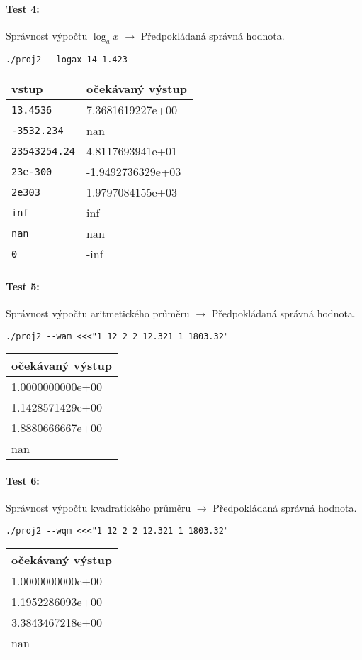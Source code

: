 \documentclass[12pt,a4paper,titlepage,final]{article}
\begin{document}
\paragraph{Test 4:} Správnost výpočtu $\log_{a}{x}$ $\longrightarrow$ Předpokládaná správná hodnota.
\begin{verbatim}
./proj2 --logax 14 1.423
\end{verbatim}
\vspace{1em}\begin{tabular}{ll} %
vstup & očekávaný výstup \\
\hline
\verb|13.4536| & 7.3681619227e+00 \\
\verb|-3532.234| & nan \\
\verb|23543254.24| & 4.8117693941e+01 \\
\verb|23e-300| & -1.9492736329e+03\\
\verb|2e303| & 1.9797084155e+03 \\
\verb|inf| & inf \\
\verb|nan| & nan \\
\verb|0| & -inf \\
\end{tabular}

\paragraph{Test 5:} Správnost výpočtu aritmetického průměru $\longrightarrow$ Předpokládaná správná hodnota.
\begin{verbatim}
./proj2 --wam <<<"1 12 2 2 12.321 1 1803.32"
\end{verbatim} 
\vspace{1em}\begin{tabular}{l} %
očekávaný výstup \\
\hline
1.0000000000e+00 \\
1.1428571429e+00 \\
1.8880666667e+00 \\
nan\\
\end{tabular}

\paragraph{Test 6:} Správnost výpočtu kvadratického průměru $\longrightarrow$ Předpokládaná správná hodnota.
\begin{verbatim}
./proj2 --wqm <<<"1 12 2 2 12.321 1 1803.32"
\end{verbatim} 
\vspace{1em}\begin{tabular}{l} %
očekávaný výstup \\
\hline
1.0000000000e+00 \\
1.1952286093e+00 \\
3.3843467218e+00 \\
nan\\
\end{tabular}
\end{document}
